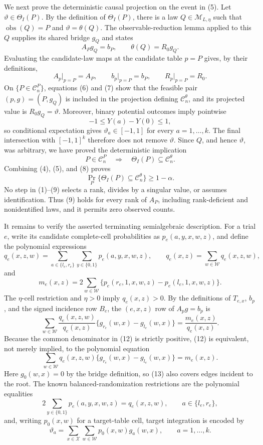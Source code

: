 We next prove the deterministic causal projection on the event in (5).  Let \(\vartheta\in\Theta_I(P)\).  By the definition of \(\Theta_I(P)\), there is a law \(Q\in\mathcal M_{L,\eta}\) such that \(\operatorname{obs}(Q)=P\) and \(\vartheta=\theta(Q)\).  The observable-reduction lemma applied to this \(Q\) supplies its shared bridge \(g_Q\) and states
\[
A_Pg_Q=b_P,
\qquad
\theta(Q)=R_0g_Q.
\tag{6}
\]
Evaluating the candidate-law maps at the candidate table \(p=P\) gives, by their definitions,
\[
A_p\big|_{p=P}=A_P,
\qquad
b_p\big|_{p=P}=b_P,
\qquad
R_p\big|_{p=P}=R_0.
\tag{7}
\]
On \(\{P\in\mathcal C_n^P\}\), equations (6) and (7) show that the feasible pair \((p,g)=(P,g_Q)\) is included in the projection defining \(\mathcal C_n^\theta\), and its projected value is \(R_0g_Q=\vartheta\).  Moreover, binary potential outcomes imply pointwise
\[
-1\leq Y(a)-Y(0)\leq 1,
\]
so conditional expectation gives \(\vartheta_a\in[-1,1]\) for every \(a=1,\ldots,k\).  The final intersection with \([-1,1]^k\) therefore does not remove \(\vartheta\).  Since \(Q\), and hence \(\vartheta\), was arbitrary, we have proved the deterministic implication
\[
P\in\mathcal C_n^P
\quad\Longrightarrow\quad
\Theta_I(P)\subseteq\mathcal C_n^\theta.
\tag{8}
\]
Combining (4), (5), and (8) proves
\[
\Pr_P\{\Theta_I(P)\subseteq\mathcal C_n^\theta\}
\geq 1-\alpha.
\tag{9}
\]
No step in (1)--(9) selects a rank, divides by a singular value, or assumes identification.  Thus (9) holds for every rank of \(A_P\), including rank-deficient and nonidentified laws, and it permits zero observed counts.

It remains to verify the asserted terminating semialgebraic description.  For a trial \(e\), write its candidate complete-cell probabilities as \(p_e(a,y,x,w,z)\), and define the polynomial expressions
\[
q_e(x,z,w)=\sum_{a\in\{l_e,r_e\}}\sum_{y\in\{0,1\}}
p_e(a,y,x,w,z),
\qquad
q_e(x,z)=\sum_{w\in\mathcal W}q_e(x,z,w),
\tag{10}
\]
and
\[
m_e(x,z)=2\sum_{w\in\mathcal W}
\{p_e(r_e,1,x,w,z)-p_e(l_e,1,x,w,z)\}.
\tag{11}
\]
The \(\eta\)-cell restriction and \(\eta>0\) imply \(q_e(x,z)>0\).  By the definitions of \(T_{e,x}\), \(b_p\), and the signed incidence row \(B_e\), the \((e,x,z)\) row of \(A_pg=b_p\) is
\[
\sum_{w\in\mathcal W}
\frac{q_e(x,z,w)}{q_e(x,z)}
\{g_{r_e}(w,x)-g_{l_e}(w,x)\}
=\frac{m_e(x,z)}{q_e(x,z)}.
\tag{12}
\]
Because the common denominator in (12) is strictly positive, (12) is equivalent, not merely implied, to the polynomial equation
\[
\sum_{w\in\mathcal W}q_e(x,z,w)
\{g_{r_e}(w,x)-g_{l_e}(w,x)\}
=m_e(x,z).
\tag{13}
\]
Here \(g_0(w,x)=0\) by the bridge definition, so (13) also covers edges incident to the root.  The known balanced-randomization restrictions are the polynomial equalities
\[
2\sum_{y\in\{0,1\}}p_e(a,y,x,w,z)=q_e(x,z,w),
\qquad a\in\{l_e,r_e\},
\tag{14}
\]
and, writing \(p_0(x,w)\) for a target-table cell, target integration is encoded by
\[
\vartheta_a=\sum_{x\in\mathcal X}\sum_{w\in\mathcal W}
p_0(x,w)g_a(w,x),
\qquad a=1,\ldots,k.
\tag{15}
\]

